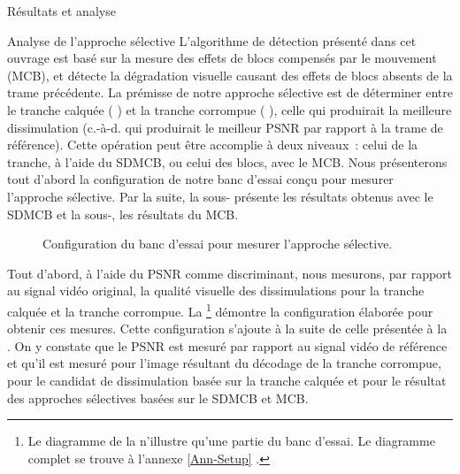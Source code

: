 \begin{chapter}{Résultats et analyse}
\begin{section}{Analyse de l'approche sélective}
L'algorithme de détection présenté dans cet ouvrage est basé sur la mesure des
effets de blocs compensés par le mouvement (MCB), et détecte la dégradation
visuelle causant des effets de blocs absents de la trame précédente. La prémisse
de notre approche sélective est de déterminer entre le tranche calquée
( ) et la tranche corrompue (
), celle qui produirait la meilleure dissimulation (c.-à-d.
qui produirait le meilleur PSNR par rapport à la trame de référence). Cette
opération peut être accomplie à deux niveaux~: celui de la tranche, à l'aide du
SDMCB, ou celui des blocs, avec le MCB. Nous présenterons tout d'abord la
configuration de notre banc d'essai conçu pour mesurer l'approche sélective. Par
la suite, la sous- présente les résultats obtenus avec le
SDMCB et la sous-, les résultats du MCB.

\begin{figure}[htb]
\caption[Banc d'essai pour mesurer l'approche sélective]{Configuration du banc
d'essai pour mesurer l'approche sélective.}
\label{fig-SelectiveSetup}
\end{figure}

Tout d'abord, à l'aide du PSNR comme discriminant, nous mesurons, par rapport au
signal vidéo original, la qualité visuelle des dissimulations pour la tranche
calquée et la tranche corrompue. La \footnote{Le
diagramme de la  n'illustre qu'une partie du banc
d'essai. Le diagramme complet se trouve à l'annexe \ref{Ann-Setup}
.} démontre la configuration élaborée pour obtenir ces mesures.
Cette configuration s'ajoute à la suite de celle présentée à la
 . On y constate que le PSNR
est mesuré par rapport au signal vidéo de référence et qu'il est mesuré pour
l'image résultant du décodage de la tranche corrompue, pour le candidat de
dissimulation basée sur la tranche calquée et pour le résultat des approches
sélectives basées sur le SDMCB et MCB.


\end{section}
\end{chapter}
